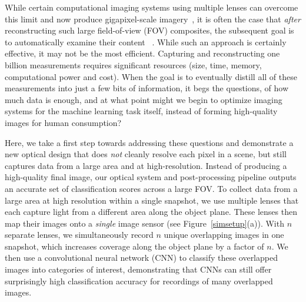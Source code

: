 \documentclass{article}
\begin{document}
 While certain computational imaging systems using multiple lenses can overcome this limit and now produce gigapixel-scale imagery~\cite{Brady12, Zheng13, Yuan17}, it is often the case that \emph{after} reconstructing such large field-of-view (FOV) composites, the subsequent goal is to automatically examine their content ~\cite{Liu17, Angelova15, Horstmeyer17}. While such an approach is certainly effective, it may not be the most efficient. Capturing and reconstructing one billion measurements requires significant resources (size, time, memory, computational power and cost). When the goal is to eventually distill all of these measurements into just a few bits of information, it begs the questions, of how much data is enough, and at what point might we begin to optimize imaging systems for the machine learning task itself, instead of forming high-quality images for human consumption?
 
 Here, we take a first step towards addressing these questions and demonstrate a new optical design that does \emph{not} cleanly resolve each pixel in a scene, but still captures data from a large area and at high-resolution. Instead of producing a high-quality final image, our optical system and post-processing pipeline outputs an accurate set of classification scores across a large FOV. To collect data from a large area at high resolution within a single snapshot, we use multiple lenses that each capture light from a different area along the object plane. These lenses then map their images onto a \emph{single} image sensor (see Figure~\ref{simsetup}(a)). With $n$ separate lenses, we simultaneously record $n$ unique overlapping images in one snapshot, which increases coverage along the object plane by a factor of $n$. We then use a convolutional neural network (CNN) to classify these overlapped images into categories of interest, demonstrating that CNNs can still offer surprisingly high classification accuracy for recordings of many overlapped images. 
\end{document}
